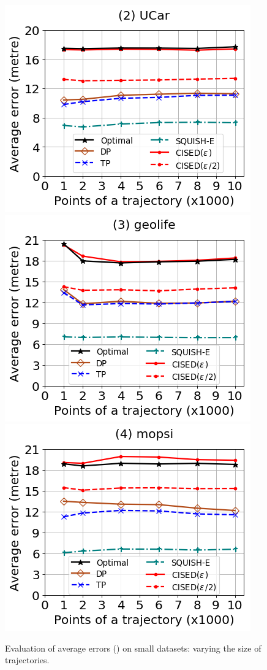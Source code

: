 \begin{figure}[tb!]
	\centering
	\includegraphics[scale=0.320]{Figures/Exp-SED-error-size-service.png} 	\hspace{3ex}
	\includegraphics[scale=0.320]{Figures/Exp-SED-error-size-geolife.png}	\hspace{3ex}
	\includegraphics[scale=0.320]{Figures/Exp-SED-error-size-mopsi.png}		
	\vspace{-2ex}
	\caption{\small Evaluation of average errors (\sed) on small datasets: varying the size of
		trajectories.}
	\label{fig:ae-sed-size}
	\vspace{-2ex}
\end{figure}


